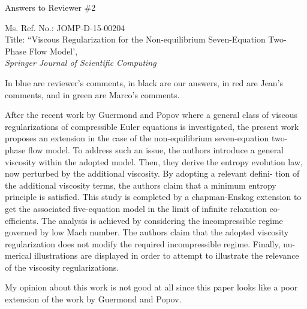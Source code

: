 \documentclass{article}
\begin{document}

\begin{center}
{ \Large Answers to Reviewer \#2}
\end{center}

\bigskip

\noindent Ms. Ref. No.: JOMP-D-15-00204\\
Title: ``Viscous Regularization for the Non-equilibrium Seven-Equation Two-Phase Flow Model', \\
{\it Springer Journal of Scientific Computing}\\

\bigskip

In {\color{blue}blue} are reviewer's comments, in black are our answers, in {\color{red}red} are Jean's comments,
and in {\color{green}green} are Marco's comments.

\bigskip

{\color{blue}
After the recent work by Guermond and Popov where a general class of viscous
regularizations of compressible Euler equations is investigated, the present work
proposes an extension in the case of the non-equilibrium seven-equation two-
phase flow model. To address such an issue, the authors introduce a general
viscosity within the adopted model. Then, they derive the entropy evolution
law, now perturbed by the additional viscosity. By adopting a relevant defini-
tion of the additional viscosity terms, the authors claim that a minimum entropy
principle is satisfied. This study is completed by a chapman-Enskog extension
to get the associated five-equation model in the limit of infinite relaxation co-
efficients. The analysis is achieved by considering the incompressible regime
governed by low Mach number. The authors claim that the adopted viscosity
regularization does not modify the required incompressible regime. Finally, nu-
merical illustrations are displayed in order to attempt to illustrate the relevance
of the viscosity regularizations.

My opinion about this work is not good at all since this paper looks like a poor
extension of the work by Guermond and Popov.}
\end{document}
